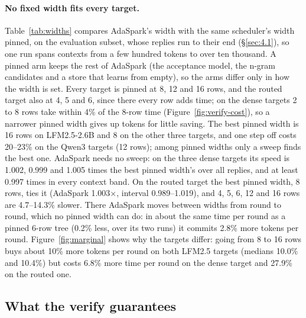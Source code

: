 \documentclass[10pt,twocolumn,letterpaper]{article}
\begin{document}
\paragraph{No fixed width fits every target.} Table~\ref{tab:widths} compares AdaSpark's width with the same scheduler's width pinned, on the evaluation subset, whose replies run to their end (\S\ref{sec:4.1}), so one run spans contexts from a few hundred tokens to over ten thousand. A pinned arm keeps the rest of AdaSpark (the acceptance model, the n-gram candidates and a store that learns from empty), so the arms differ only in how the width is set. Every target is pinned at 8, 12 and 16 rows, and the routed target also at 4, 5 and 6, since there every row adds time; on the dense targets 2 to 8 rows take within 4\% of the 8-row time (Figure~\ref{fig:verify-cost}), so a narrower pinned width gives up tokens for little saving. The best pinned width is 16 rows on LFM2.5-2.6B and 8 on the other three targets, and one step off costs 20--23\% on the Qwen3 targets (12 rows); among pinned widths only a sweep finds the best one. AdaSpark needs no sweep: on the three dense targets its speed is 1.002, 0.999 and 1.005 times the best pinned width's over all replies, and at least 0.997 times in every context band. On the routed target the best pinned width, 8 rows, ties it (AdaSpark 1.003$\times$, interval 0.989--1.019), and 4, 5, 6, 12 and 16 rows are 4.7--14.3\% slower. There AdaSpark moves between widths from round to round, which no pinned width can do: in about the same time per round as a pinned 6-row tree (0.2\% less, over its two runs) it commits 2.8\% more tokens per round. Figure~\ref{fig:marginal} shows why the targets differ: going from 8 to 16 rows buys about 10\% more tokens per round on both LFM2.5 targets (medians 10.0\% and 10.4\%) but costs 6.8\% more time per round on the dense target and 27.9\% on the routed one.





\subsection{What the verify guarantees}\label{sec:3.5}
\end{document}
